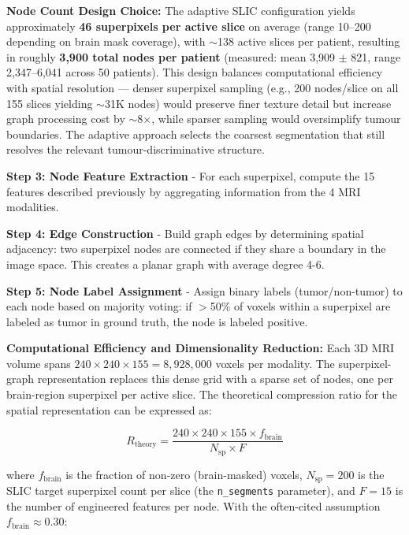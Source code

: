 \textbf{Node Count Design Choice:} The adaptive SLIC configuration yields approximately \textbf{46 superpixels per active slice} on average (range 10--200 depending on brain mask coverage), with $\sim$138 active slices per patient, resulting in roughly \textbf{3,900 total nodes per patient} (measured: mean 3,909 $\pm$ 821, range 2,347--6,041 across 50 patients). This design balances computational efficiency with spatial resolution — denser superpixel sampling (e.g., 200 nodes/slice on all 155 slices yielding $\sim$31K nodes) would preserve finer texture detail but increase graph processing cost by $\sim$8$\times$, while sparser sampling would oversimplify tumour boundaries. The adaptive approach selects the coarsest segmentation that still resolves the relevant tumour-discriminative structure.

\textbf{Step 3: Node Feature Extraction} - For each superpixel, compute the 15 features described previously by aggregating information from the 4 MRI modalities.

\textbf{Step 4: Edge Construction} - Build graph edges by determining spatial adjacency: two superpixel nodes are connected if they share a boundary in the image space. This creates a planar graph with average degree 4-6.

\textbf{Step 5: Node Label Assignment} - Assign binary labels (tumor/non-tumor) to each node based on majority voting: if $>$50\% of voxels within a superpixel are labeled as tumor in ground truth, the node is labeled positive.

\textbf{Computational Efficiency and Dimensionality Reduction:} Each 3D MRI volume spans $240 \times 240 \times 155 = 8{,}928{,}000$ voxels per modality. The superpixel-graph representation replaces this dense grid with a sparse set of nodes, one per brain-region superpixel per active slice. The theoretical compression ratio for the spatial representation can be expressed as:

\begin{equation}
R_{\text{theory}} = \frac{240 \times 240 \times 155 \times f_{\text{brain}}}{N_{\text{sp}} \times F}
\label{eq:compression_theory}
\end{equation}

where $f_{\text{brain}}$ is the fraction of non-zero (brain-masked) voxels, $N_{\text{sp}} = 200$ is the SLIC target superpixel count per slice (the \texttt{n\_segments} parameter), and $F = 15$ is the number of engineered features per node. With the often-cited assumption $f_{\text{brain}} \approx 0.30$:

